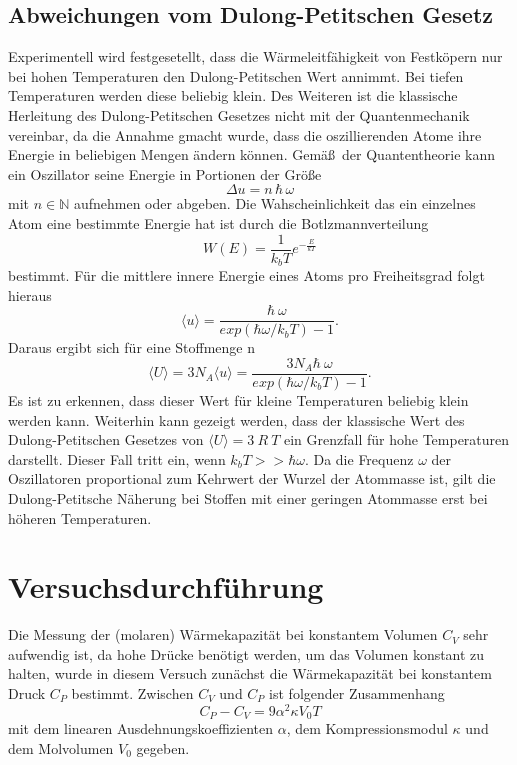 \documentclass[11pt,ngerman,a4paper]{article}
\begin{document}
\subsection{Abweichungen vom Dulong-Petitschen Gesetz}
Experimentell wird festgesetellt, dass die W\"armeleitf\"ahigkeit von Festk\"opern nur bei hohen Temperaturen den Dulong-Petitschen Wert annimmt. Bei tiefen Temperaturen werden diese beliebig klein. Des Weiteren ist die klassische Herleitung des Dulong-Petitschen Gesetzes nicht mit der Quantenmechanik vereinbar, da die Annahme gmacht wurde, dass die oszillierenden Atome ihre Energie in beliebigen Mengen \"andern k\"onnen. Gem\"a\ss \ der Quantentheorie kann ein Oszillator seine Energie in Portionen der Gr\"o\ss e 
\begin{equation}
\Delta u = n\,\hbar\,\omega
\end{equation}
mit $n \in  \mathbb{N}$ aufnehmen oder abgeben. Die Wahscheinlichkeit das ein einzelnes Atom eine bestimmte Energie hat ist durch die Botlzmannverteilung
\begin{equation}
W(E) = \frac{1}{k_bT} e^{-\frac{E}{kT}}
\end{equation}
bestimmt. F\"ur die mittlere innere Energie eines Atoms pro Freiheitsgrad folgt hieraus
\begin{equation}
\langle u \rangle = \frac{\hbar\ \omega}{exp(\hbar \omega/k_bT)-1}.
\end{equation}
Daraus ergibt sich f\"ur eine Stoffmenge n
\begin{equation}
\langle U \rangle = 3 N_A \langle u \rangle = \frac{3 N_A \hbar\ \omega}{exp(\hbar \omega/k_bT)-1}.
\end{equation}
Es ist zu erkennen, dass dieser Wert f\"ur kleine Temperaturen beliebig klein werden kann. Weiterhin kann gezeigt werden, dass der klassische Wert des Dulong-Petitschen Gesetzes von $ \langle U \rangle = 3\ R\ T$ ein Grenzfall f\"ur hohe Temperaturen darstellt. Dieser Fall tritt ein, wenn $k_b T >> \hbar \omega$. Da die Frequenz $\omega$ der Oszillatoren proportional zum Kehrwert der Wurzel der Atommasse ist, gilt die Dulong-Petitsche N\"aherung bei Stoffen mit einer geringen Atommasse erst bei h\"oheren Temperaturen.
 \section{Versuchsdurchf\"uhrung}
 Die Messung der (molaren) W\"armekapazit\"at bei konstantem Volumen $C_V$ sehr aufwendig ist, da hohe Dr\"ucke ben\"otigt werden, um das Volumen konstant zu halten, wurde in diesem Versuch zun\"achst die W\"armekapazit\"at bei konstantem Druck $C_P$ bestimmt. Zwischen $C_V$ und $C_P$ ist folgender Zusammenhang 
 \begin{equation}
C_P-C_V = 9 \alpha^2 \kappa V_0 T
 \end{equation}
 mit dem linearen Ausdehnungskoeffizienten $\alpha$, dem Kompressionsmodul $\kappa$ und dem Molvolumen $V_0$ gegeben.
\end{document}
